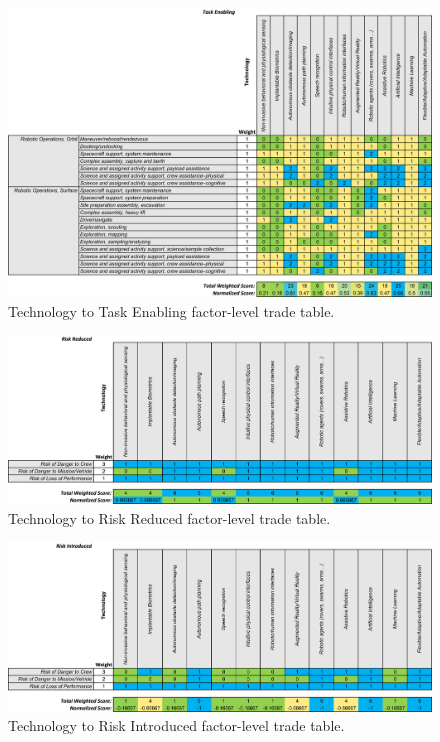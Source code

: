 \begin{figure}[b!]
    \begin{center}
        \includegraphics[width=0.8\linewidth]{figures/TradeStudy/figurea3.png}
        \caption[Technology to Task Enabling factor-level trade table]{Technology to Task Enabling factor-level trade table.}
    \end{center}
\end{figure}

\begin{figure}[b!]
    \begin{center}
        \includegraphics[width=0.8\linewidth]{figures/TradeStudy/figurea4.png}
        \caption[Technology to Risk Reduced factor-level trade table]{Technology to Risk Reduced factor-level trade table.}
    \end{center}
\end{figure}

\begin{figure}[b!]
    \begin{center}
        \includegraphics[width=0.8\linewidth]{figures/TradeStudy/figurea5.png}
        \caption[Technology to Risk Introduced factor-level trade table]{Technology to Risk Introduced factor-level trade table.}
    \end{center}
\end{figure}

